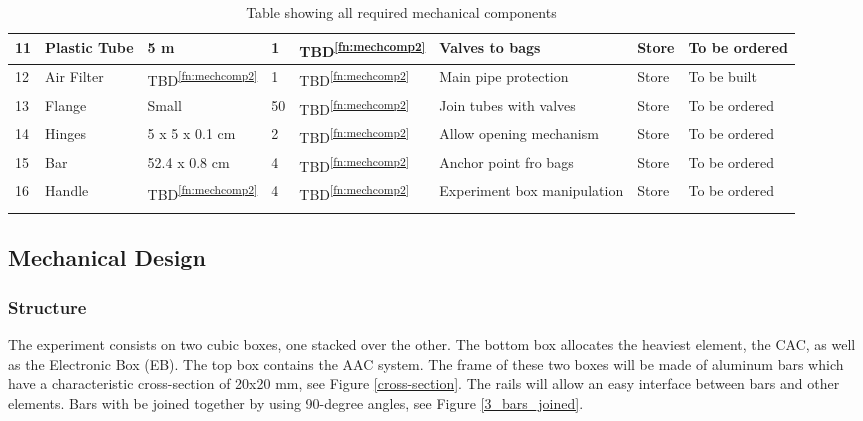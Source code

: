 \documentclass[a4paper,12pt,twoside]{article}
\begin{document}
\begin{landscape}
\begin{longtable}{|m{}|m{}|m{}|m{}|m{}|m{}|m{}|m{}|}
11 & Plastic Tube & 5 m & 1 & TBD\textsuperscript{\ref{fn:mechcomp2}} & Valves to bags & Store & To be ordered \\ \hline
12 & Air Filter & TBD\textsuperscript{\ref{fn:mechcomp2}} & 1 & TBD\textsuperscript{\ref{fn:mechcomp2}} & Main pipe protection & Store & To be built \\ \hline
13 & Flange & Small & 50 & TBD\textsuperscript{\ref{fn:mechcomp2}} & Join tubes with valves & Store & To be ordered \\ \hline
14 & Hinges & 5 x 5 x 0.1 cm & 2 & TBD\textsuperscript{\ref{fn:mechcomp2}} & Allow opening mechanism & Store & To be ordered \\ \hline
15 & Bar & 52.4 x 0.8 cm & 4 & TBD\textsuperscript{\ref{fn:mechcomp2}} & Anchor point fro bags & Store & To be ordered \\ \hline
16 & Handle & TBD\textsuperscript{\ref{fn:mechcomp2}} & 4 & TBD\textsuperscript{\ref{fn:mechcomp2}} & Experiment box manipulation & Store & To be ordered \\ \hline

    \caption{Table showing all required mechanical components}
    \label{tab:mechanical-components}
\end{longtable}
\raggedbottom


\end{landscape}

\raggedbottom
\pagebreak
\subsection{Mechanical Design} \label{Mechanical_Design}


\subsubsection{Structure}

The experiment consists on two cubic boxes, one stacked over the other. The bottom box allocates the heaviest element, the CAC, as well as the Electronic Box (EB). The top box contains the AAC system. The frame of these two boxes will be made of aluminum bars which have a characteristic cross-section of 20x20 mm, see Figure \ref{cross-section}. The rails will allow an easy interface between bars and other elements. Bars with be joined together by using 90-degree angles, see Figure \ref{3_bars_joined}.

\end{document}
